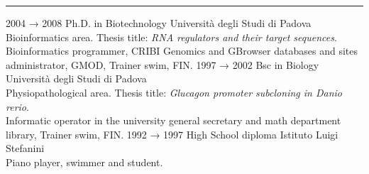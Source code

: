 \documentclass[9pt]{stackoverflow-upgraded-version} %
\begin{document}
\textcolor{stackoverflow}{\hrule}
\vspace{\baselineskip} %
\begin{entrylist}
	\entry
		{2004 → 2008}
		{Ph.D. in Biotechnology}
		{Università degli Studi di Padova}
		{\\
		Bioinformatics area. Thesis title: \emph{RNA regulators and their target sequences}.\\
		Bioinformatics programmer, CRIBI Genomics and GBrowser databases and sites administrator, GMOD, Trainer swim, FIN.}
	\entry
		{1997 → 2002}
		{Bsc in Biology}
		{Università degli Studi di Padova}
		{\\
		Physiopathological area. Thesis title: \emph{Glucagon promoter subcloning in Danio rerio}.\\
		Informatic operator in the university general secretary and math department library, Trainer swim, FIN.}
	\entry
		{1992 → 1997}
		{High School diploma}
		{Istituto Luigi Stefanini}
		{\\
		Piano player, swimmer and student.}
\end{entrylist}
\end{document}
